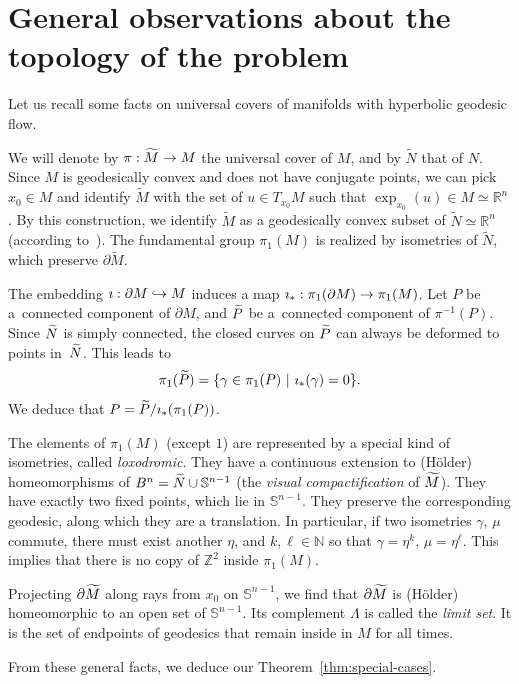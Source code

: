 \documentclass[10pt]{amsart}
\theoremstyle{definition}\newtheorem{defi}[theo]{Definition}\newtheorem{rema}[theo]{Remark}\newtheorem{exam}[theo]{Example}\newtheorem{exem}[theo]{Example}\newtheorem{nota}[theo]{Notation}
\newcommand{\R}{\mathbb{R}}
\newcommand{\Ss}{\mathbb{S}}
\newcommand{\Z}{\mathbb{Z}}
\newcommand{\N}{\mathbb{N}}
\theoremstyle{plain}
\let\oldtilde\tilde
\renewcommand*{\tilde}[1]{\mathchoice{\widetilde{#1}}{\widetilde{#1}}{\oldtilde{#1}}{\oldtilde{#1}}}
\renewcommand*{\to}{\mathchoice{\longrightarrow}{\rightarrow}{\rightarrow}{\rightarrow}}
\newcommand{\longhookrightarrow}{\lhook\joinrel\longrightarrow}
\newcommand*{\hookto}{\mathchoice{\longhookrightarrow}{\hookrightarrow}{\hookrightarrow}{\hookrightarrow}}
\begin{document}
\section{General observations about the topology of the problem}\label{sec:gen-obs-topo}

Let us recall some facts on universal covers of manifolds with hyperbolic geodesic flow.

We will denote by $\pi:\widetilde{M}\to M$ the universal cover of $M$, and by $\widetilde{N}$ that of $N$. Since $M$ is geodesically convex and does not have conjugate points, we can pick $x_0\in M$ and identify $\widetilde{M}$ with the set of $u\in T_{x_0} M$ such that $\exp_{x_0}(u)\in M\simeq \R^n$. By this construction, we identify $\widetilde{M}$ as a geodesically convex subset of $\widetilde{N}\simeq \R^n$ (according to~\cite{Kobayashi-61}). The fundamental group $\pi_1(M)$ is realized by isometries of $\widetilde{N}$, which preserve $\partial \widetilde{M}$.

The embedding $\imath : \partial M \hookto M$ induces a map $\imath_\ast : \pi_1(\partial M)\to \pi_1(M)$. Let $P$ be a~connected component of $\partial M$, and $\tilde{P}$ be a~connected component of $\pi^{-1}(P)$. Since $\tilde{N}$ is simply connected, the closed curves on $\tilde{P}$ can always be deformed to points in~$\tilde{N}$. This leads to
\[
\pi_1(\tilde{P}) = \{ \gamma \in \pi_1(P)\ |\ \imath_\ast(\gamma) = 0\}.
\]
We deduce that $P = \tilde{P}/\imath_\ast(\pi_1(P))$.

The elements of $\pi_1(M)$ (except $1$) are represented by a special kind of isometries, called \emph{loxodromic}. They have a continuous extension to (H\"older) homeomorphisms of $B^n = \tilde{N}\cup\Ss^{n-1}$ (the \emph{visual compactification} of $\tilde{M}$). They have exactly two fixed points, which lie in $\Ss^{n-1}$. They preserve the corresponding geodesic, along which they are a translation. In particular, if two isometries $\gamma$, $\mu$ commute, there must exist another $\eta$, and $k,\ell\in\N$ so that $\gamma = \eta^k$, $\mu = \eta^\ell$. This implies that there is no copy of $\Z^2$ inside $\pi_1(M)$.

Projecting $\partial \tilde{M}$ along rays from $x_0$ on $\Ss^{n-1}$, we find that $\partial\tilde{M}$ is (H\"older) homeomorphic to an open set of $\Ss^{n-1}$. Its complement $\Lambda$ is called the \emph{limit set}. It is the set of endpoints of geodesics that remain inside in $M$ for all times.

From these general facts, we deduce our Theorem~\ref{thm:special-cases}.
\end{document}
